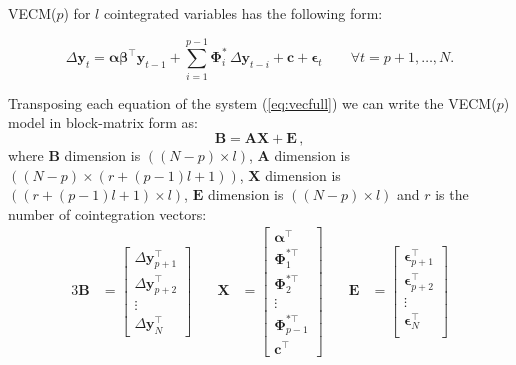 
VECM($p$) for $l$ cointegrated variables has the following form:

\begin{equation}\label{eq:vecfull}
\Delta\mathbf{y}_t 
= \boldsymbol{\alpha\beta}^\top\mathbf{y}_{t-1} 
  + \sum_{i=1}^{p-1}\boldsymbol{\Phi}_i^*\,\Delta\mathbf{y}_{t-i}
  + \mathbf{c} + \boldsymbol{\epsilon}_t \qquad \forall t = p+1,\dots,N.
\end{equation}

Transposing each equation of the system (\ref{eq:vecfull}) we can write
the VECM($p$) model in block-matrix form as:
\begin{equation}\label{eq:vareq}
\mathbf{B} = 
\mathbf{A} \mathbf{X} + 
\mathbf{E} \, , 
\end{equation}
%
\noindent where $\mathbf{B}$ dimension is $((N-p)\times l)$, $\mathbf{A}$
dimension is $((N-p)\times(r+(p-1)l +1))$, $\mathbf{X}$ dimension is $((r+(p-1)l
+1)\times l)$, $\mathbf{E}$ dimension is $((N-p)\times l)$ and $r$ is the number
of cointegration vectors:
%
\begin{alignat}{3}
\mathbf{B}
&= \begin{bmatrix}
   \Delta\mathbf{y}_{p+1}^\top \\
   \Delta\mathbf{y}_{p+2}^\top \\
   \vdots \\
   \Delta\mathbf{y}_N^\top
   \end{bmatrix}
&\quad
\mathbf{X}
&= \begin{bmatrix}
   \boldsymbol{\alpha}^\top \\
   \boldsymbol{\Phi}_1^{*\top} \\
   \boldsymbol{\Phi}_2^{*\top} \\
   \vdots \\
   \boldsymbol{\Phi}_{p-1}^{*\top} \\
   \mathbf{c}^\top
   \end{bmatrix}
&\quad
\mathbf{E}
&= \begin{bmatrix}
   \boldsymbol{\epsilon}_{p+1}^\top \\
   \boldsymbol{\epsilon}_{p+2}^\top \\
   \vdots \\
   \boldsymbol{\epsilon}_N^\top \\
   \end{bmatrix}
\end{alignat}
